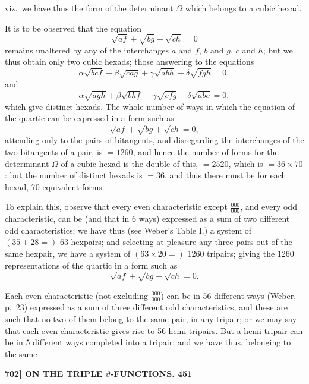 \documentclass[11pt]{article}
\begin{document}
viz.\ we have thus the form of the determinant $\Omega$ which belongs to a cubic hexad.

\medskip

It is to be observed that the equation
\[
\sqrt{af} + \sqrt{bg} + \sqrt{ch} = 0
\]
remains unaltered by any of the interchanges $a$ and $f$, $b$ and $g$, $c$ and $h$; but we thus obtain only two cubic hexads; those answering to the equations
\[
\alpha\sqrt{bcf} + \beta\sqrt{cag} + \gamma\sqrt{abh} + \delta\sqrt{fgh} = 0,
\]
and
\[
\alpha\sqrt{agh} + \beta\sqrt{bhf} + \gamma\sqrt{cfg} + \delta\sqrt{abc} = 0,
\]
which give distinct hexads. The whole number of ways in which the equation of the quartic can be expressed in a form such as
\[
\sqrt{af} + \sqrt{bg} + \sqrt{ch} = 0,
\]
attending only to the pairs of bitangents, and disregarding the interchanges of the two bitangents of a pair, is $=1260$, and hence the number of forms for the determinant $\Omega$ of a cubic hexad is the double of this, $=2520$, which is $= 36 \times 70$: but the number of distinct hexads is $=36$, and thus there must be for each hexad, 70 equivalent forms.

\medskip

To explain this, observe that every even characteristic except $\tfrac{000}{000}$, and every odd characteristic, can be (and that in 6 ways) expressed as a sum of two different odd characteristics; we have thus (see Weber's Table I.) a system of $(35 + 28 =)$ 63 hexpairs; and selecting at pleasure any three pairs out of the same hexpair, we have a system of $(63 \times 20 =)$ 1260 tripairs; giving the 1260 representations of the quartic in a form such as
\[
\sqrt{af} + \sqrt{bg} + \sqrt{ch} = 0.
\]

Each even characteristic (not excluding $\tfrac{000}{000}$) can be in 56 different ways (Weber, p.~23) expressed as a sum of three different odd characteristics, and these are such that no two of them belong to the same pair, in any tripair; or we may say that each even characteristic gives rise to 56 hemi-tripairs. But a hemi-tripair can be in 5 different ways completed into a tripair; and we have thus, belonging to the same

\bigskip
\noindent\textbf{702] \quad ON THE TRIPLE $\vartheta$-FUNCTIONS. \hfill 451}

\medskip
\end{document}
